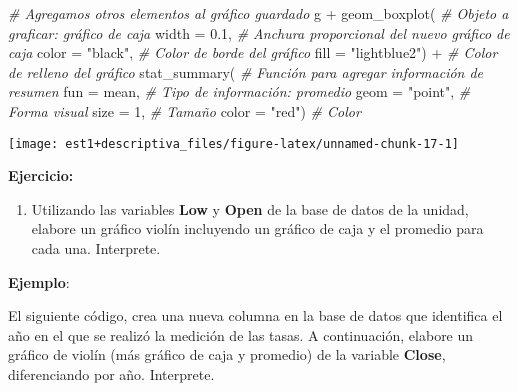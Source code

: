 \documentclass[
]{book}
\newenvironment{Shaded}{\begin{snugshade}}{\end{snugshade}}
\newcommand{\AttributeTok}[1]{\textcolor[rgb]{0.77,0.63,0.00}{#1}}
\newcommand{\CommentTok}[1]{\textcolor[rgb]{0.56,0.35,0.01}{\textit{#1}}}
\newcommand{\DecValTok}[1]{\textcolor[rgb]{0.00,0.00,0.81}{#1}}
\newcommand{\FloatTok}[1]{\textcolor[rgb]{0.00,0.00,0.81}{#1}}
\newcommand{\FunctionTok}[1]{\textcolor[rgb]{0.00,0.00,0.00}{#1}}
\newcommand{\NormalTok}[1]{#1}
\newcommand{\SpecialCharTok}[1]{\textcolor[rgb]{0.00,0.00,0.00}{#1}}
\newcommand{\StringTok}[1]{\textcolor[rgb]{0.31,0.60,0.02}{#1}}
\providecommand{\tightlist}{%
  \setlength{\itemsep}{0pt}\setlength{\parskip}{0pt}}
\begin{document}
\begin{Shaded}
\begin{Highlighting}[]
\CommentTok{\# Agregamos otros elementos al gráfico guardado}
\NormalTok{g }\SpecialCharTok{+} \FunctionTok{geom\_boxplot}\NormalTok{( }\CommentTok{\# Objeto a graficar: gráfico de caja}
  \AttributeTok{width =} \FloatTok{0.1}\NormalTok{, }\CommentTok{\# Anchura proporcional del nuevo gráfico de caja}
  \AttributeTok{color =} \StringTok{"black"}\NormalTok{, }\CommentTok{\# Color de borde del gráfico}
  \AttributeTok{fill =} \StringTok{"lightblue2"}\NormalTok{) }\SpecialCharTok{+} \CommentTok{\# Color de relleno del gráfico}
  \FunctionTok{stat\_summary}\NormalTok{( }\CommentTok{\# Función para agregar información de resumen}
    \AttributeTok{fun =}\NormalTok{ mean, }\CommentTok{\# Tipo de información: promedio}
    \AttributeTok{geom =} \StringTok{"point"}\NormalTok{, }\CommentTok{\# Forma visual}
    \AttributeTok{size =} \DecValTok{1}\NormalTok{, }\CommentTok{\# Tamaño}
    \AttributeTok{color =} \StringTok{"red"}\NormalTok{) }\CommentTok{\# Color}
\end{Highlighting}
\end{Shaded}

\begin{center}\texttt{[image: est1+descriptiva\_files/figure-latex/unnamed-chunk-17-1]} \end{center}

\textbf{Ejercicio:}

\begin{enumerate}
\def\labelenumi{\arabic{enumi}.}
\tightlist
\item
  Utilizando las variables \textbf{Low} y \textbf{Open} de la base de datos de la unidad, elabore un gráfico violín incluyendo un gráfico de caja y el promedio para cada una. Interprete.
\end{enumerate}

\textbf{Ejemplo}:

El siguiente código, crea una nueva columna en la base de datos que identifica el año en el que se realizó la medición de las tasas. A continuación, elabore un gráfico de violín (más gráfico de caja y promedio) de la variable \textbf{Close}, diferenciando por año. Interprete.
\end{document}
